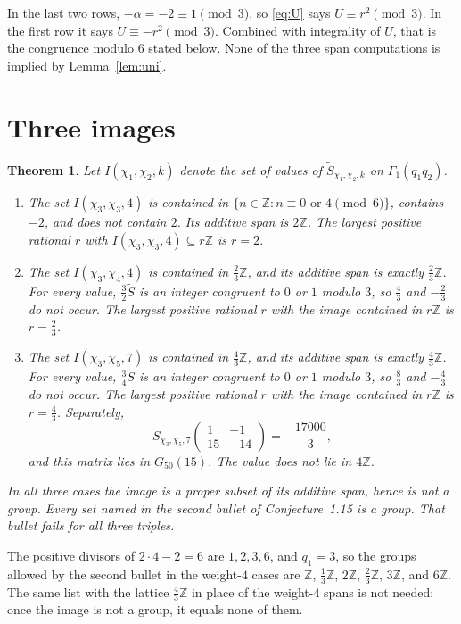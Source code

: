 \documentclass[11pt]{article}
\newtheorem{theorem}{Theorem}
\theoremstyle{remark}
\newcommand{\tS}{\widetilde{S}}
\newcommand{\Z}{\mathbb{Z}}
\begin{document}
In the last two rows, \(-\alpha=-2\equiv 1\pmod{3}\), so \eqref{eq:U} says \(U\equiv r^2\pmod{3}\).
In the first row it says \(U\equiv -r^2\pmod{3}\).
Combined with integrality of \(U\), that is the congruence modulo \(6\) stated below.
None of the three span computations is implied by Lemma~\ref{lem:uni}.

\section{Three images}
\label{sec:three}

\begin{theorem}
\label{thm:three}
Let \(I(\chi_1,\chi_2,k)\) denote the set of values of \(\tS_{\chi_1,\chi_2,k}\) on \(\Gamma_1(q_1q_2)\).
\begin{enumerate}
\item The set \(I(\chi_3,\chi_3,4)\) is contained in \(\{n\in\Z:n\equiv 0\text{ or }4\pmod{6}\}\), contains \(-2\), and does not contain \(2\).
Its additive span is \(2\Z\).
The largest positive rational \(r\) with \(I(\chi_3,\chi_3,4)\subseteq r\Z\) is \(r=2\).
\item The set \(I(\chi_3,\chi_4,4)\) is contained in \(\tfrac23\Z\), and its additive span is exactly \(\tfrac23\Z\).
For every value, \(\tfrac32\tS\) is an integer congruent to \(0\) or \(1\) modulo \(3\), so \(\tfrac43\) and \(-\tfrac23\) do not occur.
The largest positive rational \(r\) with the image contained in \(r\Z\) is \(r=\tfrac23\).
\item The set \(I(\chi_3,\chi_5,7)\) is contained in \(\tfrac43\Z\), and its additive span is exactly \(\tfrac43\Z\).
For every value, \(\tfrac34\tS\) is an integer congruent to \(0\) or \(1\) modulo \(3\), so \(\tfrac83\) and \(-\tfrac43\) do not occur.
The largest positive rational \(r\) with the image contained in \(r\Z\) is \(r=\tfrac43\).
Separately,
\[
\tS_{\chi_3,\chi_5,7}\begin{pmatrix}1&-1\\15&-14\end{pmatrix}=-\frac{17000}{3},
\]
and this matrix lies in \(G_{50}(15)\).
The value does not lie in \(4\Z\).
\end{enumerate}
In all three cases the image is a proper subset of its additive span, hence is not a group.
Every set named in the second bullet of Conjecture~1.15 is a group.
That bullet fails for all three triples.
\end{theorem}

The positive divisors of \(2\cdot 4-2=6\) are \(1,2,3,6\), and \(q_1=3\), so the groups allowed by the second bullet in the weight-\(4\) cases are \(\Z\), \(\tfrac13\Z\), \(2\Z\), \(\tfrac23\Z\), \(3\Z\), and \(6\Z\).
The same list with the lattice \(\tfrac43\Z\) in place of the weight-\(4\) spans is not needed: once the image is not a group, it equals none of them.
\end{document}
